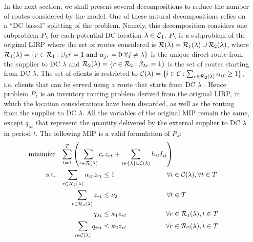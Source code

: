 \documentclass[a4paper,10pt]{article}
\begin{document}
\begin{linenumbers}
In the next section, we shall present several decompositions to reduce the number of routes considered by the model. 
One of these natural decompositions relies on a ``DC based'' splitting of the problem. 
Namely, this decomposition considers one subproblem $P_{\lambda}$ for each potential DC location $\lambda\in \mathcal{L}_1$.
$P_{\lambda}$ is a subproblem of the original LIRP where the set of routes considered is $\mathcal{R}(\lambda)= \mathcal{R}_1(\lambda) \cup \mathcal{R}_2(\lambda)$, where $\mathcal{R}_1(\lambda)=\left\{r\in\mathcal{R}_1:\beta_{\lambda}r=1 \mbox{ and } \alpha_{jr}=0\ \forall j\neq \lambda\right\}$ is the unique direct route from the supplier to DC $\lambda$ and $\mathcal{R}_2(\lambda)=\left\{r\in\mathcal{R}_2: \beta_{\lambda r}=1\right\}$ is the set of routes starting from DC $\lambda$.
The set of clients is restricted to $\mathcal{C}(\lambda) =\{i\in\mathcal{C}: \sum_{r\in\mathcal{R}_2(\lambda)} \alpha_{ir}\geq 1 \}$, i.e. clients that can be served using a route that starts from DC $\lambda$ . 
Hence problem $P_{\lambda}$ is an inventory routing problem derived from the original LIRP, in which the location considerations have been discarded, as well as the routing from the supplier to DC $\lambda$. 
All the variables of the original MIP remain the same, except $q_{\lambda t}$ that represent the quantity delivered by the external supplier to DC $\lambda$ in period $t$.
The following MIP is a valid formulation of $P_{\lambda}$:
\begin{alignat}{3}
	\text{minimize} &&\sum_{t=1}^{T} \left( \sum_{r\in \ro(\lambda)} c_r z_{rt} + \sum_{i\in \left\{\lambda\right\}\cup \cu(\lambda)} h_{it} I_{it}\right)\span\omit\span\label{decomp_objfunct}\\ 
	\text{s.t.}  %
	&&\sum_{r\in \ro_2(\lambda)} \alpha_{ir} z_{rt} &\leq 1 															&\forall i&\in \cu(\lambda), \forall t\in T  \label{const:decomp_singleroutecustomers}\\
	&&\sum_{r\in \ro_2(\lambda)} z_{rt} &\leq 	\nu_2													&\forall t&\in T  \label{const:decomp_fleetcapa}\\
	&&q_{\lambda t}   		&\leq \kappa_1 z_{rt} 														&\forall r&\in \ro_1(\lambda), t\in T\label{const:decomp_deliveryDCUB}\\
	&&\sum_{i\in \cu(\lambda)} q_{irt}   		&\leq \kappa_2 z_{rt} 														&\forall r&\in \ro_2(\lambda), t\in T\label{const:decomp_deliveryUB}\\

\end{alignat}
\end{linenumbers}
\end{document}
